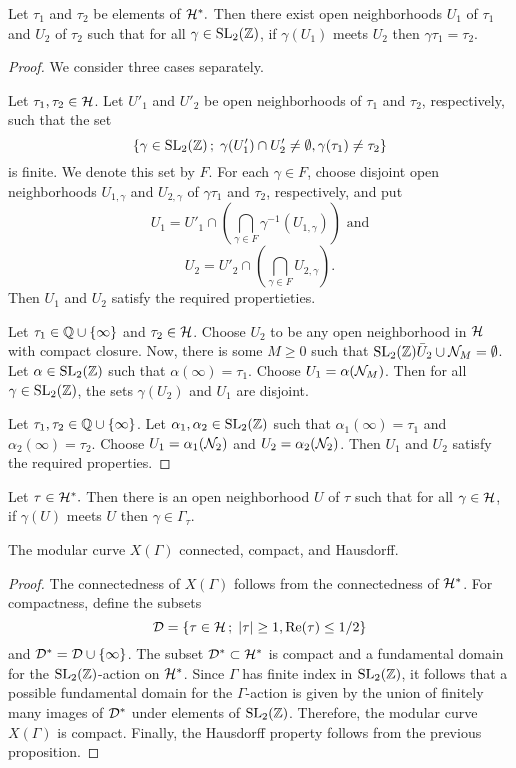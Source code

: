 \begin{prop}
 Let $\tau_1$ and $\tau_2$ be elements of $\mathcal{H}^*.$ Then there exist open neighborhoods $U_1$ of $\tau_1$ and $U_2$ of $\tau_2$ such that for all $\gamma\in\operatorname{SL}_2(\mathbb{Z})$, if $\gamma(U_1)$ meets $U_2$ then $\gamma\tau_1 = \tau_2$.
\end{prop}

\begin{proof}
 We consider three cases separately.
 
  Let $\tau_1,\tau_2\in\mathcal{H}$. Let $U'_1$ and $U'_2$ be open neighborhoods of $\tau_1$ and $\tau_2$, respectively, such that the set
 \[\{\gamma\in\operatorname{SL}_2(\mathbb{Z})\,;\; \gamma(U'_1)\cap U'_2\neq\emptyset, \gamma(\tau_1)\neq \tau_2\}\]
 is finite. We denote this set by $F$. For each $\gamma\in F$, choose disjoint open neighborhoods $U_{1,\gamma}$ and $U_{2,\gamma}$ of $\gamma\tau_1$ and $\tau_2$, respectively, and put
 \[U_1 = U'_1\cap\left(\bigcap_{\gamma\in F}\gamma^{-1}(U_{1,\gamma})\right)\text{ and}\]
 \[U_2 = U'_2\cap\left(\bigcap_{\gamma\in F}U_{2,\gamma}\right).\]
 Then $U_1$ and $U_2$ satisfy the required propertieties.
 
  Let $\tau_1\in\mathbb{Q}\cup\{\infty\}$ and $\tau_2\in\mathcal{H}$. Choose $U_2$ to be any open neighborhood in $\mathcal{H}$ with compact closure. Now, there is some $M\geq 0$ such that $\operatorname{SL}_2(\mathbb{Z})\bar{U}_2\cup\mathcal{N}_M=\emptyset$. Let $\alpha\in\operatorname{SL}_2(\mathbb{Z})$ such that $\alpha(\infty)=\tau_1$. Choose $U_1=\alpha(\mathcal{N}_M)$. Then for all $\gamma\in\operatorname{SL}_2(\mathbb{Z})$, the sets $\gamma(U_2)$ and $U_1$ are disjoint.
 
  Let $\tau_1,\tau_2\in\mathbb{Q}\cup\{\infty\}$. Let $\alpha_1,\alpha_2\in\operatorname{SL}_2(\mathbb{Z})$ such that $\alpha_1(\infty)=\tau_1$ and $\alpha_2(\infty)=\tau_2$. Choose $U_1=\alpha_1(\mathcal{N}_2)$ and $U_2=\alpha_2(\mathcal{N}_2)$. Then $U_1$ and $U_2$ satisfy the required properties.
\end{proof}

\begin{cor} \label{pr:chart-nhood}
 Let $\tau\in\mathcal{H}^*.$ Then there is an open neighborhood $U$ of $\tau$ such that for all $\gamma\in\mathcal{H}$, if $\gamma(U)$ meets $U$ then $\gamma\in\Gamma_\tau$.
\end{cor}

\begin{prop}
 The modular curve $X(\Gamma)$ connected, compact, and Hausdorff.
\end{prop}

\begin{proof}
 The connectedness of $X(\Gamma)$ follows from the connectedness of $\mathcal{H}^*$. For compactness, define the subsets
 \[\mathcal{D}=\{\tau\in\mathcal{H}\,;\; |\tau|\geq 1, \operatorname{Re}(\tau)\leq 1/2\}\] and $\mathcal{D}^*=\mathcal{D}\cup\{\infty\}$. The subset $\mathcal{D}^*\subset\mathcal{H}^*$ is compact and a fundamental domain for the $\operatorname{SL}_2(\mathbb{Z})$-action on $\mathcal{H}^*$. Since $\Gamma$ has finite index in $\operatorname{SL}_2(\mathbb{Z})$, it follows that a possible fundamental domain for the $\Gamma$-action is given by the union of finitely many images of $\mathcal{D}^*$ under elements of $\operatorname{SL}_2(\mathbb{Z})$. Therefore, the modular curve $X(\Gamma)$ is compact. Finally, the Hausdorff property follows from the previous proposition. 
\end{proof}

